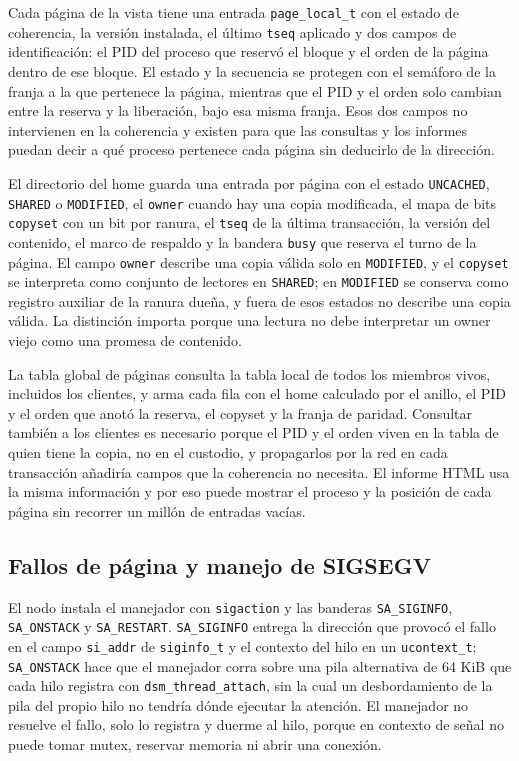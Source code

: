 Cada página de la vista tiene una entrada \texttt{page\_local\_t} con el estado de coherencia, la versión instalada, el último \texttt{tseq} aplicado y dos campos de identificación: el PID del proceso que reservó el bloque y el orden de la página dentro de ese bloque. El estado y la secuencia se protegen con el semáforo de la franja a la que pertenece la página, mientras que el PID y el orden solo cambian entre la reserva y la liberación, bajo esa misma franja. Esos dos campos no intervienen en la coherencia y existen para que las consultas y los informes puedan decir a qué proceso pertenece cada página sin deducirlo de la dirección.

El directorio del home guarda una entrada por página con el estado \texttt{UNCACHED}, \texttt{SHARED} o \texttt{MODIFIED}, el \texttt{owner} cuando hay una copia modificada, el mapa de bits \texttt{copyset} con un bit por ranura, el \texttt{tseq} de la última transacción, la versión del contenido, el marco de respaldo y la bandera \texttt{busy} que reserva el turno de la página. El campo \texttt{owner} describe una copia válida solo en \texttt{MODIFIED}, y el \texttt{copyset} se interpreta como conjunto de lectores en \texttt{SHARED}; en \texttt{MODIFIED} se conserva como registro auxiliar de la ranura dueña, y fuera de esos estados no describe una copia válida. La distinción importa porque una lectura no debe interpretar un owner viejo como una promesa de contenido.

La tabla global de páginas consulta la tabla local de todos los miembros vivos, incluidos los clientes, y arma cada fila con el home calculado por el anillo, el PID y el orden que anotó la reserva, el copyset y la franja de paridad. Consultar también a los clientes es necesario porque el PID y el orden viven en la tabla de quien tiene la copia, no en el custodio, y propagarlos por la red en cada transacción añadiría campos que la coherencia no necesita. El informe HTML usa la misma información y por eso puede mostrar el proceso y la posición de cada página sin recorrer un millón de entradas vacías.

\subsection{Fallos de página y manejo de SIGSEGV}\label{sec:fallos-pagina}

El nodo instala el manejador con \texttt{sigaction} y las banderas \texttt{SA\_SIGINFO}, \texttt{SA\_ONSTACK} y \texttt{SA\_RESTART}. \texttt{SA\_SIGINFO} entrega la dirección que provocó el fallo en el campo \texttt{si\_addr} de \texttt{siginfo\_t} y el contexto del hilo en un \texttt{ucontext\_t}; \texttt{SA\_ONSTACK} hace que el manejador corra sobre una pila alternativa de 64 KiB que cada hilo registra con \texttt{dsm\_thread\_attach}, sin la cual un desbordamiento de la pila del propio hilo no tendría dónde ejecutar la atención. El manejador no resuelve el fallo, solo lo registra y duerme al hilo, porque en contexto de señal no puede tomar mutex, reservar memoria ni abrir una conexión.

